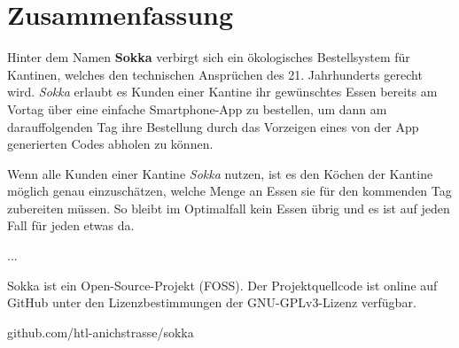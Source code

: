 \section*{Zusammenfassung}

Hinter dem Namen \textbf{Sokka} verbirgt sich ein ökologisches Bestellsystem für Kantinen, welches den technischen Ansprüchen des 21. Jahrhunderts gerecht wird. \textit{Sokka} erlaubt es Kunden einer Kantine ihr gewünschtes Essen bereits am Vortag über eine einfache Smartphone-App zu bestellen, um dann am darauffolgenden Tag ihre Bestellung durch das Vorzeigen eines von der App generierten Codes abholen zu können.

Wenn alle Kunden einer Kantine \textit{Sokka} nutzen, ist es den Köchen der Kantine möglich genau einzuschätzen, welche Menge an Essen sie für den kommenden Tag zubereiten müssen. So bleibt im Optimalfall kein Essen übrig und es ist auf jeden Fall für jeden etwas da.

...

Sokka ist ein Open-Source-Projekt (FOSS). Der Projektquellcode ist online auf GitHub unter den Lizenzbestimmungen der GNU-GPLv3-Lizenz verfügbar.

github.com/htl-anichstrasse/sokka

\newpage